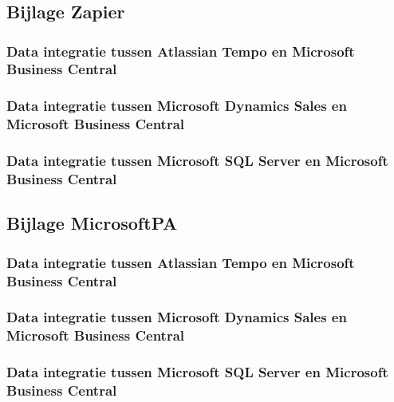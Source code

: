 \chapter{}
\label{ch:bijlage}

\section{Bijlage Zapier}
\label{bijlageZapier}

\subsection{Data integratie tussen Atlassian Tempo en Microsoft Business Central}
\label{Zapier1}

\subsection{Data integratie tussen Microsoft Dynamics Sales en Microsoft Business Central}
\label{Zapier2}

\subsection{Data integratie tussen Microsoft SQL Server en Microsoft Business Central}
\label{Zapier3}

\section{Bijlage MicrosoftPA}
\label{bijlageMicrosoft}

\subsection{Data integratie tussen Atlassian Tempo en Microsoft Business Central}
\label{Microsoft1}

\subsection{Data integratie tussen Microsoft Dynamics Sales en Microsoft Business Central}
\label{Microsoft2}

\subsection{Data integratie tussen Microsoft SQL Server en Microsoft Business Central}
\label{Microsoft3}